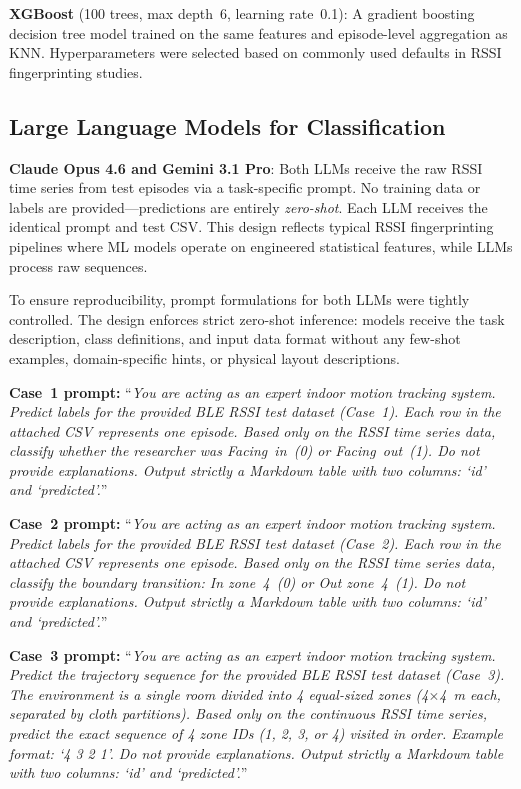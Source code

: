 \documentclass[conference]{IEEEtran}
\begin{document}
\textbf{XGBoost} (100 trees, max depth~6, learning rate~0.1): A gradient boosting decision tree model trained on the same features and episode-level aggregation as KNN. Hyperparameters were selected based on commonly used defaults in RSSI fingerprinting studies.

\subsection{Large Language Models for Classification}
\label{sec:prompts}

\textbf{Claude Opus 4.6 and Gemini 3.1 Pro}: Both LLMs receive the raw RSSI time series from test episodes via a task-specific prompt. No training data or labels are provided---predictions are entirely \textit{zero-shot}. Each LLM receives the identical prompt and test CSV. This design reflects typical RSSI fingerprinting pipelines where ML models operate on engineered statistical features, while LLMs process raw sequences.

To ensure reproducibility, prompt formulations for both LLMs were tightly controlled. The design enforces strict zero-shot inference: models receive the task description, class definitions, and input data format without any few-shot examples, domain-specific hints, or physical layout descriptions.

\textbf{Case~1 prompt:} ``\textit{You are acting as an expert indoor motion tracking system. Predict labels for the provided BLE RSSI test dataset (Case~1). Each row in the attached CSV represents one episode. Based only on the RSSI time series data, classify whether the researcher was Facing~in~(0) or Facing~out~(1). Do not provide explanations. Output strictly a Markdown table with two columns: `id' and `predicted'.}'' 

\textbf{Case~2 prompt:} ``\textit{You are acting as an expert indoor motion tracking system. Predict labels for the provided BLE RSSI test dataset (Case~2). Each row in the attached CSV represents one episode. Based only on the RSSI time series data, classify the boundary transition: In zone~4~(0) or Out zone~4~(1). Do not provide explanations. Output strictly a Markdown table with two columns: `id' and `predicted'.}'' 

\textbf{Case~3 prompt:} ``\textit{You are acting as an expert indoor motion tracking system. Predict the trajectory sequence for the provided BLE RSSI test dataset (Case~3). The environment is a single room divided into 4 equal-sized zones (4$\times$4~m each, separated by cloth partitions). Based only on the continuous RSSI time series, predict the exact sequence of 4 zone IDs (1, 2, 3, or 4) visited in order. Example format: `4 3 2 1'. Do not provide explanations. Output strictly a Markdown table with two columns: `id' and `predicted'.}''
\end{document}
